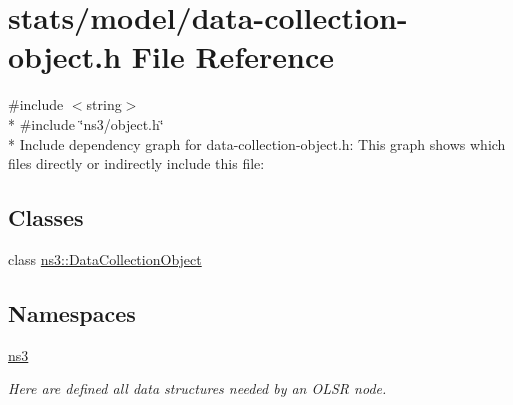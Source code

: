 \hypertarget{data-collection-object_8h}{}\section{stats/model/data-\/collection-\/object.h File Reference}
\label{data-collection-object_8h}
{\ttfamily \#include $<$string$>$}\\*
{\ttfamily \#include \char`\"{}ns3/object.\+h\char`\"{}}\\*
Include dependency graph for data-\/collection-\/object.h\+:
This graph shows which files directly or indirectly include this file\+:
\subsection*{Classes}
\begin{DoxyCompactItemize}
\item 
class \hyperlink{classns3_1_1DataCollectionObject}{ns3\+::\+Data\+Collection\+Object}
\end{DoxyCompactItemize}
\subsection*{Namespaces}
\begin{DoxyCompactItemize}
\item 
 \hyperlink{namespacens3}{ns3}
\begin{DoxyCompactList}\small\item\em Here are defined all data structures needed by an O\+L\+SR node. \end{DoxyCompactList}\end{DoxyCompactItemize}
